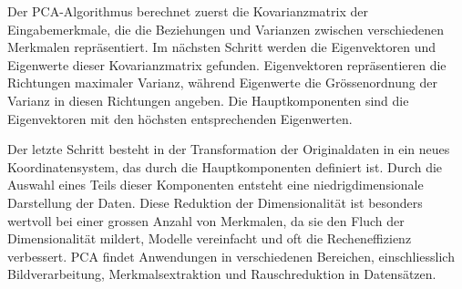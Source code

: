 Der PCA-Algorithmus berechnet zuerst die Kovarianzmatrix der Eingabemerkmale, die die Beziehungen und Varianzen zwischen verschiedenen Merkmalen repräsentiert. Im nächsten Schritt werden die Eigenvektoren und Eigenwerte dieser Kovarianzmatrix gefunden. Eigenvektoren repräsentieren die Richtungen maximaler Varianz, während Eigenwerte die Grössenordnung der Varianz in diesen Richtungen angeben. Die Hauptkomponenten sind die Eigenvektoren mit den höchsten entsprechenden Eigenwerten.

Der letzte Schritt besteht in der Transformation der Originaldaten in ein neues Koordinatensystem, das durch die Hauptkomponenten definiert ist. Durch die Auswahl eines Teils dieser Komponenten entsteht eine niedrigdimensionale Darstellung der Daten. Diese Reduktion der Dimensionalität ist besonders wertvoll bei einer grossen Anzahl von Merkmalen, da sie den Fluch der Dimensionalität mildert, Modelle vereinfacht und oft die Recheneffizienz verbessert. PCA findet Anwendungen in verschiedenen Bereichen, einschliesslich Bildverarbeitung, Merkmalsextraktion und Rauschreduktion in Datensätzen.
